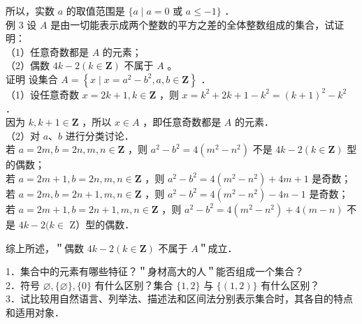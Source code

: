 \documentclass[10pt]{article}
\begin{document}
所以，实数 \(a\) 的取值范围是 \(\{a \mid a=0\) 或 \(a \leqslant-1\}\) ．\\
例 3 设 \(A\) 是由一切能表示成两个整数的平方之差的全体整数组成的集合，试证明：\\
（1）任意奇数都是 \(A\) 的元素；\\
（2）偶数 \(4 k-2(k \in \mathbf{Z})\) 不属于 \(A\) 。\\
证明 设集合 \(A=\left\{x \mid x=a^{2}-b^{2}, a, b \in \mathbf{Z}\right\}\) ．\\
（1）设任意奇数 \(x=2 k+1, k \in \mathbf{Z}\) ，则 \(x=k^{2}+2 k+1-k^{2}=(k+1)^{2}-k^{2}\) ．\\
因为 \(k, k+1 \in \mathbf{Z}\) ，所以 \(x \in A\) ，即任意奇数都是 \(A\) 的元素．\\
（2）对 \(a 、 b\) 进行分类讨论．\\
若 \(a=2 m, b=2 n, m, n \in \mathbf{Z}\) ，则 \(a^{2}-b^{2}=4\left(m^{2}-n^{2}\right)\) 不是 \(4 k-2(k \in \mathbf{Z})\) 型的偶数；\\
若 \(a=2 m+1, b=2 n, m, n \in \mathbf{Z}\) ，则 \(a^{2}-b^{2}=4\left(m^{2}-n^{2}\right)+4 m+1\) 是奇数；\\
若 \(a=2 m, b=2 n+1, m, n \in \mathbf{Z}\) ，则 \(a^{2}-b^{2}=4\left(m^{2}-n^{2}\right)-4 n-1\) 是奇数；\\
若 \(a=2 m+1, b=2 n+1, m, n \in \mathbf{Z}\) ，则 \(a^{2}-b^{2}=4\left(m^{2}-n^{2}\right)+4(m-n)\) 不是 \(4 k-2(k \in\) Z）型的偶数．

综上所述，＂偶数 \(4 k-2(k \in \mathbf{Z})\) 不属于 \(A\)＂成立．

1．集合中的元素有哪些特征？＂身材高大的人＂能否组成一个集合？\\
2．符号 \(\varnothing,\{\varnothing\},\{0\}\) 有什么区别？集合 \(\{1,2\}\) 与 \(\{(1,2)\}\) 有什么区别？\\
3．试比较用自然语言、列举法、描述法和区间法分别表示集合时，其各自的特点和适用对象．
\end{document}
